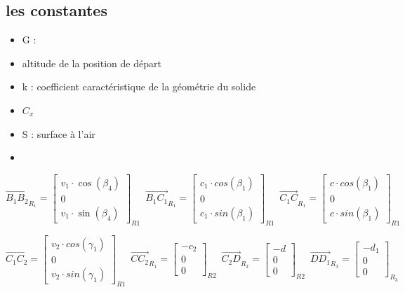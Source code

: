 \documentclass[12pt,a4paper]{article}
\begin{document}
\subsection{les constantes}

\begin{itemize}
	\item G : 
	\item altitude de la position de départ
	\item k : coefficient caractéristique de la géométrie du solide
	\item $C_x$
	\item S : surface à l'air
	\item 
\end{itemize}


\begin{equation}
\vec{B_1 B_2}_{R_{1}}=
\begin{bmatrix}
v_1\cdot \cos(\beta_4) \\
0\\
v_1\cdot \sin(\beta_4)
\end{bmatrix}_{R1} \enspace
\vec{B_1 C_1}_{R_{1}}=
\begin{bmatrix}
c_1\cdot cos(\beta_1) \\
0\\
c_1\cdot sin(\beta_1)
\end{bmatrix}_{R1} \enspace
\vec{C_1 C}_{R_{1}}=
\begin{bmatrix}
c\cdot cos(\beta_1) \\
0\\
c\cdot sin(\beta_1)
\end{bmatrix}_{R1} \enspace
\end{equation}

\begin{equation}
\vec{C_1 C_2}=
\begin{bmatrix}
v_2\cdot cos(\gamma_1) \\
0\\
v_2 \cdot sin(\gamma_1)
\end{bmatrix}_{R1} \enspace
\vec{C C_2}_{R_{1}}=
\begin{bmatrix}
-c_2\\
0\\
0
\end{bmatrix}_{R2} \enspace
\vec{C_2 D}_{R_2}=
\begin{bmatrix}
-d\\
0\\
0
\end{bmatrix}_{R2} \enspace
\vec{D D_1}_{R_3}=
\begin{bmatrix}
- d_1\\
0\\
0
\end{bmatrix}_{R_3} \enspace
\end{equation}
\end{document}
